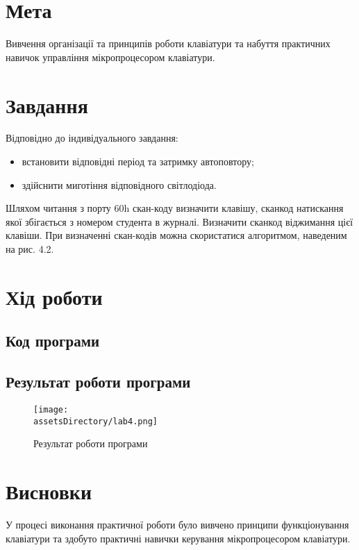 \section{Мета}
Вивчення організації та принципів роботи клавіатури та набуття практичних навичок управління мікропроцесором клавіатури.


\section{Завдання}
Відповідно до індивідуального завдання:
\begin{itemize}
    \item встановити відповідні період та затримку автоповтору;
    \item здійснити миготіння відповідного світлодіода.
\end{itemize}
Шляхом читання з порту 60h скан-коду визначити клавішу,
сканкод натискання якої збігається з номером студента в журналі.
Визначити сканкод віджимання цієї клавіши.
При визначенні скан-кодів можна скористатися алгоритмом, наведеним на рис. 4.2.

\section{Хід роботи}
\subsection{Код програми}


\subsection{Результат роботи програми}
\begin{figure}[ht!]
    \centering
    \texttt{[image: \\assetsDirectory/lab4.png]}
    \caption{Результат роботи програми}
\end{figure}

\clearpage
\section{Висновки}
У процесі виконання практичної роботи було вивчено принципи функціонування клавіатури та здобуто практичні навички керування мікропроцесором клавіатури.

